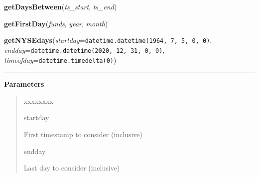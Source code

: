     \vspace{0.5ex}

\hspace{.8\funcindent}\begin{boxedminipage}{\funcwidth}

    \raggedright \textbf{getDaysBetween}(\textit{ts\_start}, \textit{ts\_end})

\setlength{\parskip}{2ex}
\setlength{\parskip}{1ex}
    \end{boxedminipage}

    \label{QSTK:qstkutil:dateutil:getFirstDay}

    \vspace{0.5ex}

\hspace{.8\funcindent}\begin{boxedminipage}{\funcwidth}

    \raggedright \textbf{getFirstDay}(\textit{funds}, \textit{year}, \textit{month})

\setlength{\parskip}{2ex}
\setlength{\parskip}{1ex}
    \end{boxedminipage}

    \label{QSTK:qstkutil:dateutil:getNYSEdays}

    \vspace{0.5ex}

\hspace{.8\funcindent}\begin{boxedminipage}{\funcwidth}

    \raggedright \textbf{getNYSEdays}(\textit{startday}={\tt datetime.datetime(1964, 7, 5, 0, 0)}, \textit{endday}={\tt datetime.datetime(2020, 12, 31, 0, 0)}, \textit{timeofday}={\tt datetime.timedelta(0)})

    \vspace{-1.5ex}

    \rule{\textwidth}{0.5\fboxrule}
\setlength{\parskip}{2ex}
\setlength{\parskip}{1ex}
      \textbf{Parameters}
      \vspace{-1ex}

      \begin{quote}
        \begin{Ventry}{xxxxxxxx}

          \item[startday]

          First timestamp to consider (inclusive)

          \item[endday]

          Last day to consider (inclusive)

        \end{Ventry}

      \end{quote}

    \end{boxedminipage}

